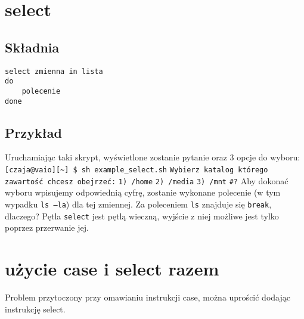 \documentclass[10 pt, a4paper, draft]{article}
\begin{document}
\section{select}
\subsection{Składnia}

\begin{lstlisting}
select zmienna in lista
do
	polecenie
done
\end{lstlisting}

\subsection{Przykład}


Uruchamiając taki skrypt, wyświetlone zostanie pytanie oraz 3 opcje do wyboru: \newline \newline
\texttt{[czaja@vaio][\textasciitilde] \$ sh example\_select.sh} \newline
\texttt{Wybierz katalog którego zawartość chcesz obejrzeć:} \newline
\texttt{1) /home} \newline
\texttt{2) /media} \newline
\texttt{3) /mnt} \newline
\texttt{\#?} \newline \newline
Aby dokonać wyboru wpisujemy odpowiednią cyfrę, zostanie wykonane polecenie (w tym
wypadku \texttt{ls –la}) dla tej zmiennej. Za poleceniem \texttt{ls} znajduje się \texttt{break}, dlaczego? Pętla \texttt{select} jest pętlą wieczną, wyjście z niej możliwe jest tylko poprzez przerwanie jej.
 
\section{użycie case i select razem}
Problem przytoczony przy omawianiu instrukcji case, można uprościć dodając instrukcję select. \newline

\end{document}
